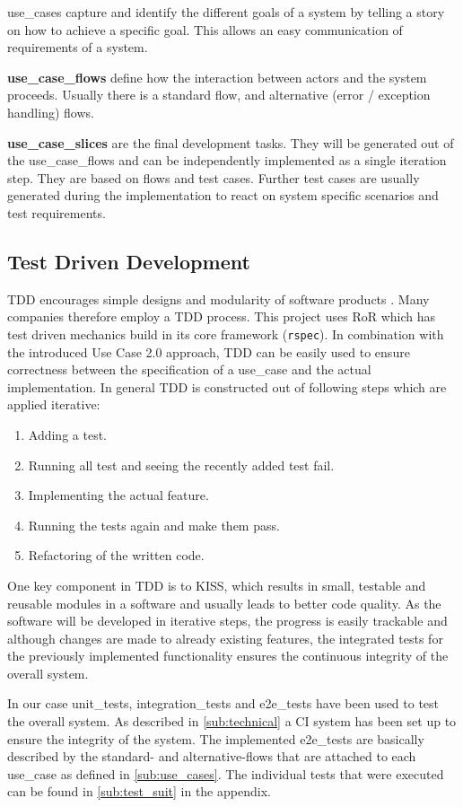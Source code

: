 \Glspl{use_case} capture and identify the different goals of a system by telling a story on how to achieve a specific goal. This allows an easy communication of requirements of a system. \cite{jacobson2011usecase}

\textbf{\Glspl{use_case_flow}} define how the interaction between actors and the system proceeds. Usually there is a standard flow, and alternative (error / exception handling) flows. 

\textbf{\Glspl{use_case_slice}} are the final development tasks. They will be generated out of the \glspl{use_case_flow} and can be independently implemented as a single iteration step. They are based on flows and test cases. Further test cases are usually generated during the implementation to react on system specific scenarios and test requirements.


\subsection{Test Driven Development}
\label{sec:tdd}
\Gls{TDD} encourages simple designs and modularity of software products \cite{tdd}. Many companies therefore employ a \gls{TDD} process. This project uses \gls{RoR} which has test driven mechanics build in its core framework (\texttt{rspec}). In combination with the introduced Use Case 2.0 approach, \gls{TDD} can be easily used to ensure correctness between the specification of a \gls{use_case} and the actual implementation. In general \gls{TDD} is constructed out of following steps which are applied iterative: 

\begin{enumerate}
	\item Adding a test.
	\item Running all test and seeing the recently added test fail.
	\item Implementing the actual feature.
	\item Running the tests again and make them pass.
	\item Refactoring of the written code.
\end{enumerate}


One key component in \gls{TDD} is to \gls{KISS}, which results in small, testable and reusable modules in a software and usually leads to better code quality. As the software will be developed in iterative steps, the progress is easily trackable and although changes are made to already existing features, the integrated tests for the previously implemented functionality ensures the continuous integrity of the overall system.  

In our case \glspl{unit_test}, \glspl{integration_test} and \glspl{e2e_test} have been used to test the overall system. As described in \autoref{sub:technical} a \gls{CI} system has been set up to ensure the integrity of the system. The implemented \glspl{e2e_test} are basically described by the standard- and alternative-flows that are attached to each \gls{use_case} as defined in \autoref{sub:use_cases}. The individual tests that were executed can be found in \autoref{sub:test_suit} in the appendix.



